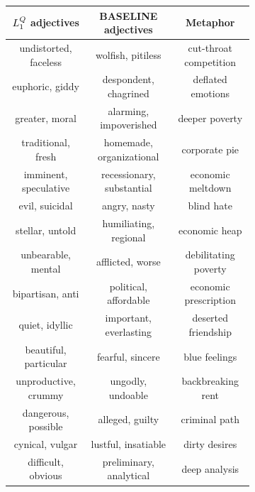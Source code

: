 \documentclass[9pt,twocolumn,twoside,lineno]{pnas-new}
\newcommand{\Listener}{L}
\newcommand{\QLONE}{\Listener_{{1}}^{{Q}}}
\begin{document}
	\begin{figure}
		\hspace{4em}
		\begin{subfigure}{0.3\textwidth}
			\begin{center}

			\setlength\extrarowheight{-10pt}
			\renewcommand{\arraystretch}{0.1}
			\begin{tabular}{ c | c | c  }
			 \tiny $\protect\QLONE$ adjectives & \tiny BASELINE adjectives & \tiny Metaphor \\ 
			\hline
			\tiny undistorted, faceless & \tiny wolfish, pitiless & \tiny cut-throat competition\\
			\tiny euphoric, giddy & \tiny despondent, chagrined & \tiny deflated emotions\\
			\tiny greater, moral & \tiny alarming, impoverished & \tiny deeper poverty\\
			\tiny traditional, fresh & \tiny homemade, organizational & \tiny corporate pie\\
			\tiny imminent, speculative & \tiny recessionary, substantial & \tiny economic meltdown\\
			\tiny evil, suicidal & \tiny angry, nasty & \tiny blind hate\\
			\tiny stellar, untold & \tiny humiliating, regional & \tiny economic heap\\
			\tiny unbearable, mental & \tiny afflicted, worse & \tiny debilitating poverty\\
			\tiny bipartisan, anti & \tiny political, affordable & \tiny economic prescription\\
			\tiny quiet, idyllic & \tiny important, everlasting & \tiny deserted friendship\\
			\tiny beautiful, particular & \tiny fearful, sincere & \tiny blue feelings\\
			\tiny unproductive, crummy & \tiny ungodly, undoable & \tiny backbreaking rent\\
			\tiny dangerous, possible & \tiny alleged, guilty & \tiny criminal path\\
			\tiny cynical, vulgar & \tiny lustful, insatiable & \tiny dirty desires\\
			\tiny difficult, obvious & \tiny preliminary, analytical & \tiny deep analysis\\

\end{tabular}
\end{center}
\end{subfigure}
\end{figure}
\end{document}
